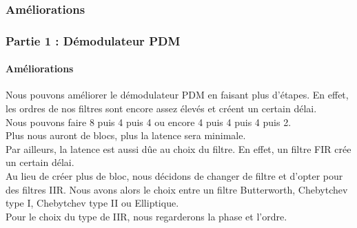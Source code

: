 \documentclass[
10pt,
aspectratio=169,
]{beamer}
\begin{document}
\subsubsection{Améliorations}
\begin{frame}
\frametitle{Partie 1 : Démodulateur PDM} 
\framesubtitle{Améliorations} 
Nous pouvons améliorer le démodulateur PDM en faisant plus d'étapes. En effet, les ordres de nos filtres sont encore assez élevés et créent un certain délai.\\
Nous pouvons faire {8 puis 4 puis 4} ou encore {4 puis 4 puis 4 puis 2}.\\
Plus nous auront de blocs, plus la latence sera minimale.\\
\vspace{0.5cm}
Par ailleurs, la latence est aussi dûe au choix du filtre. En effet, un filtre FIR crée un certain délai.\\
Au lieu de créer plus de bloc, nous décidons de changer de filtre et d'opter pour des filtres IIR. Nous avons alors le choix entre un filtre Butterworth, Chebytchev type I, Chebytchev type II ou Elliptique.\\
Pour le choix du type de IIR, nous regarderons la phase et l'ordre.
\end{frame}
\end{document}
